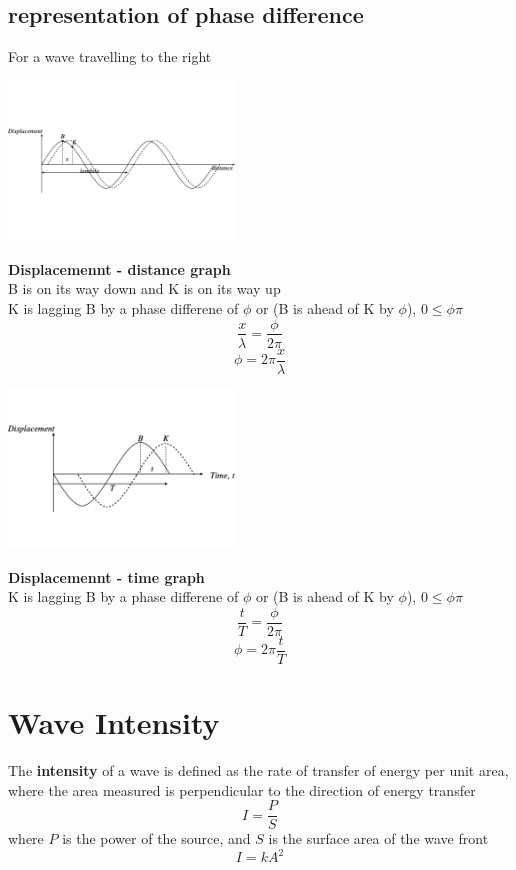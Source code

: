 \documentclass[a4paper, 10pt]{article}
\begin{document}
\subsection{representation of phase difference}
For a wave travelling to the right \\
\begin{minipage}{0.5\textwidth}
\includegraphics[trim = 50 50 50 50, width=6cm]{figures/3.pdf}
\end{minipage}	
\begin{minipage}{0.5\textwidth}
\textbf{Displacemennt - distance graph} \\
   B is on its way down and K is on its way up \\
   K is lagging B by a phase differene of $\phi$ or (B is ahead of K by $\phi$), $0 \le \phi \pi$ 
   \[
   \frac{x}{\lambda} = \frac{\phi}{2\pi}
   \]
   \[
   \phi = 2 \pi \frac{x}{\lambda}
   \]
\end{minipage}	

\begin{minipage}{0.5\textwidth}
\includegraphics[trim = 50 50 50 50, width=6cm]{figures/4.pdf}
\end{minipage}	
\begin{minipage}{0.5\textwidth}
\textbf{Displacemennt - time graph} \\
   K is lagging B by a phase differene of $\phi$ or (B is ahead of K by $\phi$), $0 \le \phi \pi$   
   \[
   \frac{t}{T} = \frac{\phi}{2\pi}
   \]
   \[
   \phi = 2 \pi \frac{t}{T}
   \]
\end{minipage}	

\section{Wave Intensity}
\begin{framed}
   The \textbf{intensity} of a wave is defined as the rate of transfer of energy per unit area, where the area measured is perpendicular to the direction of energy transfer
   \[
   I = \frac{P}{S}
   \]
where $P$ is the power of the source, and $S$ is the surface area of the wave front
\[
I = kA^2
\]
\end{framed}	
\end{document}
